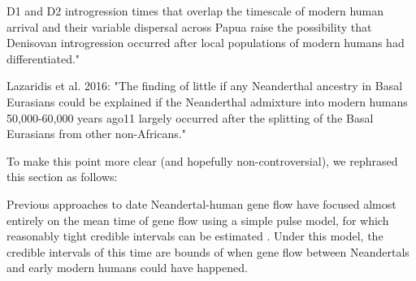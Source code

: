\documentclass[11pt]{article}
\begin{document}
D1 and D2 introgression times that overlap the timescale of modern human arrival and their variable dispersal across Papua raise the possibility that Denisovan introgression occurred after local populations of modern humans had differentiated."

Lazaridis et al. 2016: "The finding of little if any Neanderthal ancestry in Basal Eurasians could be explained if the Neanderthal admixture into modern humans 50,000-60,000 years ago11 largely occurred after the splitting of the Basal Eurasians from other non-Africans."

To make this point more clear (and hopefully non-controversial), we rephrased this section as follows:

\begin{mdframed}[hidealllines=true,backgroundcolor=grey!20]
Previous approaches to date Neandertal-human gene flow have focused almost entirely on the mean time of gene flow using a simple pulse model, for which reasonably tight credible intervals can be estimated \citep{sankararaman_date_2012, moorjani_genetic_2016}. Under this model, the credible intervals of this time are bounds of when gene flow between Neandertals and early modern humans could have happened. 
\end{mdframed}
\end{document}
